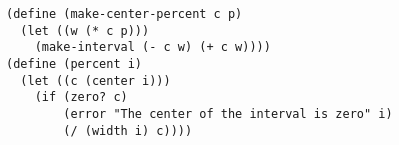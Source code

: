 \documentclass[a4paper,12pt]{article}
\begin{document}
\begin{lstlisting}
(define (make-center-percent c p)
  (let ((w (* c p)))
    (make-interval (- c w) (+ c w))))
(define (percent i)
  (let ((c (center i)))
    (if (zero? c)
        (error "The center of the interval is zero" i)
        (/ (width i) c))))
\end{lstlisting}
\end{document}
